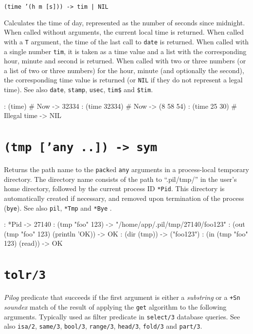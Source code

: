 {\texttt{(time '(h m [s])) -> tim | NIL}

Calculates the time of day, represented as the number of seconds since
midnight. When called without arguments, the current local time is
returned. When called with a \texttt{T} argument, the time of the last call to
\texttt{date} is returned. When called with a single number \texttt{tim}, it is taken
as a time value and a list with the corresponding hour, minute and
second is returned. When called with two or three numbers (or a list of
two or three numbers) for the hour, minute (and optionally the second),
the corresponding time value is returned (or \texttt{NIL} if they do not
represent a legal time). See also \texttt{date}, \texttt{stamp}, \texttt{usec}, \texttt{tim\$} and
\texttt{\$tim}.


\begin{wideverbatim}
: (time)                         # Now
-> 32334
: (time 32334)                   # Now
-> (8 58 54)
: (time 25 30)                   # Illegal time
-> NIL
\end{wideverbatim}

 
\section*{\texttt{(tmp ['any ..]) -> sym}}
\label{sec:func-ref-T-(tmp ['any ..]) -> sym}


Returns the path name to the \texttt{pack}ed \texttt{any} arguments in a process-local
temporary directory. The directory name consists of the path to
``.pil/tmp/'' in the user's home directory, followed by the current
process ID \texttt{*Pid}. This directory is automatically created if necessary,
and removed upon termination of the process (\texttt{bye}). See also \texttt{pil},
\texttt{*Tmp} and \texttt{*Bye} .


\begin{wideverbatim}
: *Pid
-> 27140
: (tmp "foo" 123)
-> "/home/app/.pil/tmp/27140/foo123"
: (out (tmp "foo" 123) (println 'OK))
-> OK
: (dir (tmp))
-> ("foo123")
: (in (tmp "foo" 123) (read))
-> OK
\end{wideverbatim}

 
\section*{\texttt{tolr/3}}
\label{sec:func-ref-T-tolr/3}


\emph{Pilog} predicate that succeeds if the first argument
is either a \emph{substring} or a \texttt{+Sn} \emph{soundex} match of the result of
applying the \texttt{get} algorithm to the following arguments. Typically used
as filter predicate in \texttt{select/3} database queries. See also \texttt{isa/2},
\texttt{same/3}, \texttt{bool/3}, \texttt{range/3}, \texttt{head/3}, \texttt{fold/3} and \texttt{part/3}.


}

